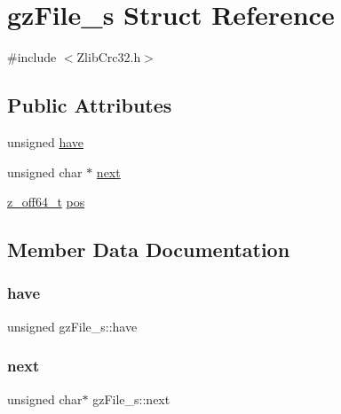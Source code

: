 \hypertarget{structgzFile__s}{}\section{gz\+File\+\_\+s Struct Reference}
\label{structgzFile__s}


{\ttfamily \#include $<$Zlib\+Crc32.\+h$>$}

\subsection*{Public Attributes}
\begin{DoxyCompactItemize}
\item 
unsigned \mbox{\hyperlink{structgzFile__s_abb96e208e17a991c09b4df6cefcc1c04}{have}}
\item 
unsigned char $\ast$ \mbox{\hyperlink{structgzFile__s_a8c1f4682372cc228f4e37bf7f95870a8}{next}}
\item 
\mbox{\hyperlink{ZlibCrc32_8h_ab9923767082c7a76924b31493e60d42c}{z\+\_\+off64\+\_\+t}} \mbox{\hyperlink{structgzFile__s_a98038b7edb4ab55ee321fa388afb687e}{pos}}
\end{DoxyCompactItemize}


\subsection{Member Data Documentation}
\mbox{\label{structgzFile__s_abb96e208e17a991c09b4df6cefcc1c04}} 
\subsubsection{\texorpdfstring{have}{have}}
{\footnotesize\ttfamily unsigned gz\+File\+\_\+s\+::have}

\mbox{\label{structgzFile__s_a8c1f4682372cc228f4e37bf7f95870a8}} 
\subsubsection{\texorpdfstring{next}{next}}
{\footnotesize\ttfamily unsigned char$\ast$ gz\+File\+\_\+s\+::next}

\mbox{\label{structgzFile__s_a98038b7edb4ab55ee321fa388afb687e}} 
